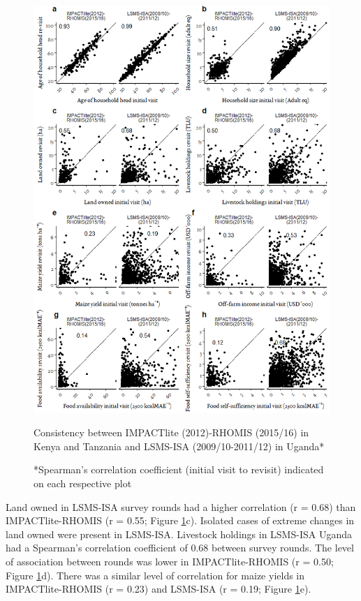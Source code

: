 \begin{figure}
  \includegraphics[width=1\textwidth]{figs_03/image2.png}
  \captionsetup{singlelinecheck = off, justification=justified} %
  \caption{Consistency between IMPACTlite (2012)-RHOMIS (2015/16) in Kenya and Tanzania and LSMS-ISA (2009/10-2011/12) in Uganda*}
  \label{fig:03_2}
  \vspace*{-3mm}
  \caption*{*Spearman's correlation coefficient (initial visit to revisit) indicated on each respective plot}
\end{figure}


Land owned in LSMS-ISA survey rounds had a higher correlation (r = 0.68) than IMPACTlite-RHOMIS (r = 0.55; Figure \ref{fig:03_2}c). Isolated cases of extreme changes in land owned were present in LSMS-ISA. Livestock holdings in LSMS-ISA Uganda had a Spearman's correlation coefficient of 0.68 between survey rounds. The level of association between rounds was lower in IMPACTlite-RHOMIS (r = 0.50; Figure \ref{fig:03_2}d). There was a similar level of correlation for maize yields in IMPACTlite-RHOMIS (r = 0.23) and LSMS-ISA (r = 0.19; Figure \ref{fig:03_2}e).

